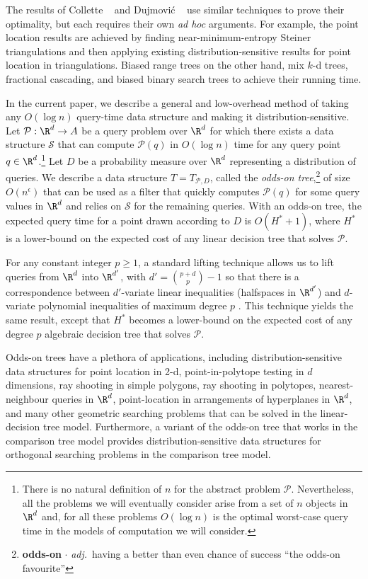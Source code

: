 \documentclass{patmorin}
\newcommand{\eps}{\epsilon}
\begin{document}
The results of Collette \etal\ \cite{cdilm08,cdilm09} and Dujmovi\'c
\etal\ \cite{dhm09} use similar techniques to prove their optimality,
but each requires their own \textit{ad hoc} arguments.  For example, the point
location results are achieved by finding near-minimum-entropy Steiner
triangulations and then applying existing distribution-sensitive results
for point location in triangulations.  Biased range trees on the other
hand, mix $k$-d trees, fractional cascading, and biased binary search
trees to achieve their running time.

In the current paper, we describe a general and low-overhead method
of taking any $O(\log n)$ query-time data structure and making it
distribution-sensitive.  Let $\mathcal{P}:\R^d\rightarrow A$ be a query
problem over $\R^d$ for which there exists a data structure $\mathcal{S}$
that can compute $\mathcal{P}(q)$ in $O(\log n)$ time for any query
point $q\in\R^d$.\footnote{There is no natural definition of $n$ for
the abstract problem $\mathcal{P}$.  Nevertheless, all the problems
we will eventually consider arise from a set of $n$ objects in $\R^d$
and, for all these problems $O(\log n)$ is the optimal worst-case
query time in the models of computation we will consider.}  Let $D$
be a probability measure over $\R^d$ representing a distribution
of queries.  We describe a data structure $T=T_{\mathcal{P},D}$,
called the \emph{odds-on tree},\footnote{\textbf{odds-on} $\cdot$
\textit{adj.}\ having a better than even chance of success ``the odds-on
favourite''}  of size $O(n^\eps)$ that can be used as a filter that
quickly computes $\mathcal{P}(q)$ for some query values in $\R^d$ and
relies on $\mathcal{S}$ for the remaining queries.  With an odds-on tree,
the expected query time for a point drawn according to $D$ is $O(H^*+1)$,
where $H^*$ is a lower-bound on the expected cost of any linear decision
tree that solves $\mathcal{P}$.

For any constant integer $p\ge 1$, a standard lifting technique allows us
to lift queries from $\R^d$ into $\R^{d'}$, with $d'={p+d \choose p}-1$
so that there is a correspondence between $d'$-variate linear inequalities
(halfspaces in $\R^{d'}$) and $d$-variate polynomial inequalities of
maximum degree $p$ \cite{yy85}.  This technique yields the same result,
except that $H^*$ becomes a lower-bound on the expected cost of any
degree $p$ algebraic decision tree that solves $\mathcal{P}$.

Odds-on trees have a plethora of applications, including
distribution-sensitive data structures for point location in 2-d,
point-in-polytope testing in $d$ dimensions, ray shooting in simple
polygons, ray shooting in polytopes, nearest-neighbour queries in $\R^d$,
point-location in arrangements of hyperplanes in $\R^d$, and many other
geometric searching problems that can be solved in the linear-decision
tree model.  Furthermore, a variant of the odds-on tree that works in
the comparison tree model provides distribution-sensitive data structures
for orthogonal searching problems in the comparison tree model.
\end{document}
